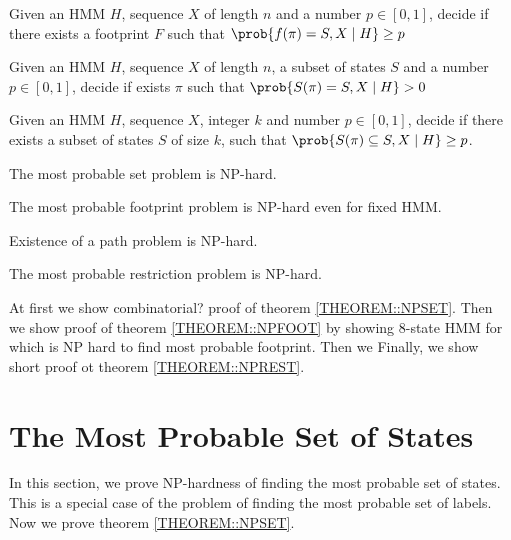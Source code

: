 \begin{definition}
 Given an HMM $H$, sequence $X$
of length $n$ and a number $p\in [0,1]$, decide if there exists a footprint $F$
such that $\prob{f(\pi) = S, X\mid H}\geq p$
\end{definition}

\begin{definition}
 Given an HMM $H$, sequence
$X$ of length $n$, a subset of states $S$ and a number $p\in [0,1]$, decide if
exists $\pi$ such that $\prob{S(\pi)=S,X\mid H} > 0$
\end{definition}

\begin{definition}
Given an HMM $H$, sequence $X$, integer $k$ and number $p\in[0,1]$, decide if
there exists a subset of states $S$ of size $k$, such that
$\prob{S(\pi)\subseteq S, X\mid H} \geq p$.
\end{definition}

\begin{theorem}
The most probable set problem is NP-hard. \label{THEOREM::NPSET}
\end{theorem}

\begin{theorem}
The most probable footprint problem is NP-hard even for fixed HMM.
\label{THEOREM::NPFOOT}
\end{theorem}

\begin{theorem}
Existence of a path problem is NP-hard. \label{THEOREM::NPEXIST}
\end{theorem}

\begin{theorem}
The most probable restriction problem is NP-hard. \label{THEOREM::NPREST}
\end{theorem}

At first we show combinatorial? proof of theorem \ref{THEOREM::NPSET}. Then we
show proof of theorem \ref{THEOREM::NPFOOT} by showing $8$-state HMM for 
which is NP hard to find most probable footprint. Then we 
Finally, we show short proof ot theorem \ref{THEOREM::NPREST}.


\section{The Most Probable Set of States}
\label{sec:set}
In this section, we prove NP-hardness of finding the most probable set
of states. This is a special case of the
problem of finding the most probable set of labels. Now we prove theorem
\ref{THEOREM::NPSET}.

